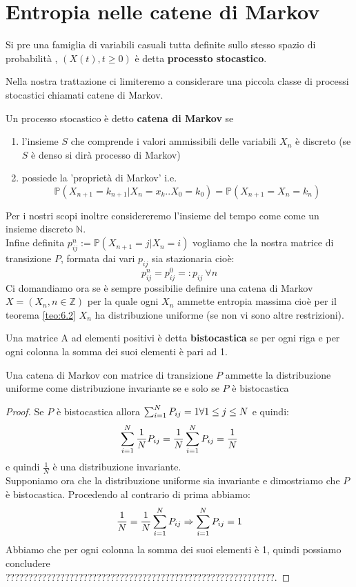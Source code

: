 \section{Entropia nelle catene di Markov}
\label{sec:markEntropia}
\begin{defi}
Si pre una famiglia di variabili casuali tutta definite sullo stesso spazio di probabilità \spacep , $(X(t), t \geq 0 )$ è detta \textbf{processto stocastico}.
\end{defi}
Nella nostra trattazione ci limiteremo a considerare una piccola classe di processi stocastici chiamati catene di Markov.
\begin{defi}
Un processo stocastico è detto \textbf{catena di Markov} se 
\begin{enumerate}
\item l'insieme $S$ che comprende i valori ammissibili delle variabili $X_n$ è discreto (se $S$ è denso si dirà processo di Markov)
\item possiede la 'proprietà di Markov' i.e. $$\mathbb{P}(X_{n+1}=k_{n+1}|X_n=x_k..X_0=k_0)=\mathbb{P}(X_{n+1}=X_n=k_n)$$
\end{enumerate}
\end{defi}
Per i nostri scopi inoltre considereremo l'insieme del tempo come come un insieme discreto $\mathbb{N}$.\\
Infine definita $p_{ij}^n:=\mathbb{P}(X_{n+1}=j|X_n=i)$ vogliamo che la nostra matrice di transizione $P$, formata dai vari $p_{ij}$ sia stazionaria cioè:\\
$$p_{ij}^n=p_{ij}^0=: p_{ij} \  \forall n$$
Ci domandiamo ora se è sempre possibilie definire una catena di Markov $X=(X_n,n\in\mathbb{Z})$ per la quale ogni $X_n$ ammette entropia massima cioè per il teorema \ref{teo:6.2} $X_n$ ha distribuzione uniforme (se non vi sono altre restrizioni).
\begin{defi}
Una matrice A ad elementi positivi è detta \textbf{bistocastica} se per ogni riga e per ogni colonna la somma dei suoi elementi è pari ad 1.
\end{defi}
\begin{teo}
Una catena di Markov con matrice di transizione $P$ ammette la distribuzione uniforme come distribuzione invariante se e solo se $P$ è bistocastica
\end{teo}
\begin{proof}
Se $P$ è bistocastica allora $ \sum_{i=1}^N P_{ij}=1 \forall 1\leq j \leq N$ e quindi:
$$\sum_{i=1}^N \frac{1}{N}P_{ij}=\frac{1}{N}\sum_{i=1}^N P_{ij}=\frac{1}{N}$$
e quindi $\frac{1}{N}$ è una distribuzione invariante.\\
Supponiamo ora che la distribuzione uniforme sia invariante e dimostriamo che $P$ è bistocastica. Procedendo al contrario di prima abbiamo:
$$\frac{1}{N}=\frac{1}{N} \sum_{i=1}^N P_{ij} \Rightarrow \sum_{i=1}^N P_{ij}=1$$
Abbiamo che per ogni colonna la somma dei suoi elementi è 1, quindi possiamo concludere\\
???????????????????????????????????????????????????????????.
\end{proof}

